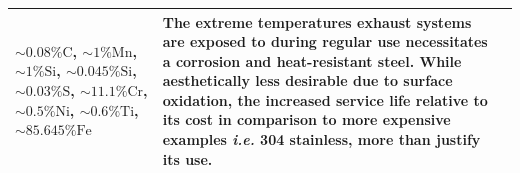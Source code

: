 \documentclass[../main.tex]{subfiles}
\begin{document}
\begin{table}[h!]
\begin{center}
\begin{tabularx}{\textwidth}{
				| >{\RaggedRight\arraybackslash}X
				| >{\Centering\arraybackslash}X
				| >{\RaggedRight\arraybackslash}X |}
			$\sim0.08\%\mathrm{C}$, $\sim1\%\mathrm{Mn}$, $\sim1\%\mathrm{Si}$, $\sim0.045\%\mathrm{Si}$, $\sim0.03\%\mathrm{S}$, $\sim11.1\%\mathrm{Cr}$, $\sim0.5\%\mathrm{Ni}$, $\sim0.6\%\mathrm{Ti}$, $\sim85.645\%\mathrm{Fe}$  \parencite{ss409ds}                                                                      &
			The extreme temperatures exhaust systems are exposed to during regular use necessitates a corrosion and heat-resistant steel. While aesthetically less desirable due to surface oxidation, the increased service life relative to its cost in comparison to more expensive examples \textit{i.e.} 304 stainless, more than justify its use. \parencite{ss409vs304}                      \\
			\hline
		\end{tabularx}
	\end{center}
\end{table}
\newpage
\end{document}
